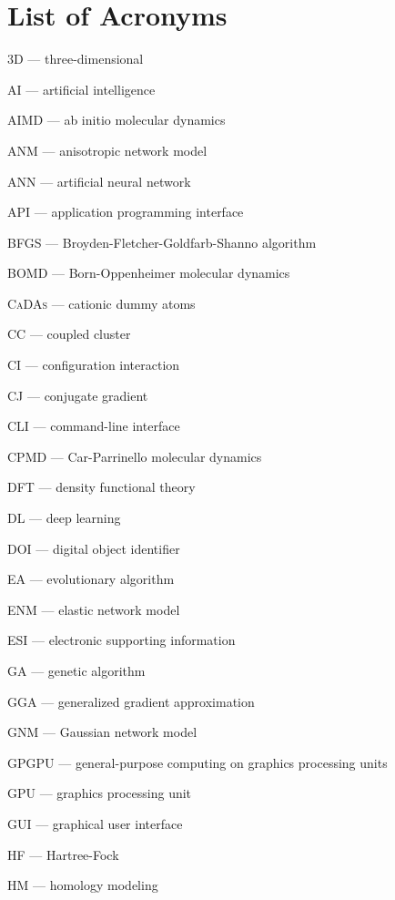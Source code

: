 
\chapter*{List of Acronyms}

\textsc{3D} --- three-dimensional

\textsc{AI} --- artificial intelligence

\textsc{AIMD} --- ab initio molecular dynamics

\textsc{ANM} --- anisotropic network model

\textsc{ANN} --- artificial neural network

\textsc{API} --- application programming interface

\textsc{BFGS} --- Broyden-Fletcher-Goldfarb-Shanno algorithm

\textsc{BOMD} --- Born-Oppenheimer molecular dynamics

\textsc{CaDAs} --- cationic dummy atoms

\textsc{CC} --- coupled cluster

\textsc{CI} --- configuration interaction

\textsc{CJ} --- conjugate gradient

\textsc{CLI} --- command-line interface

\textsc{CPMD} --- Car-Parrinello molecular dynamics

\textsc{DFT} --- density functional theory

\textsc{DL} --- deep learning

\textsc{DOI} --- digital object identifier

\textsc{EA} --- evolutionary algorithm

\textsc{ENM} --- elastic network model

\textsc{ESI} --- electronic supporting information

\textsc{GA} --- genetic algorithm

\textsc{GGA} --- generalized gradient approximation

\textsc{GNM} --- Gaussian network model

\textsc{GPGPU} --- general-purpose computing on graphics processing units

\textsc{GPU} --- graphics processing unit

\textsc{GUI} --- graphical user interface

\textsc{HF} --- Hartree-Fock

\textsc{HM} --- homology modeling

